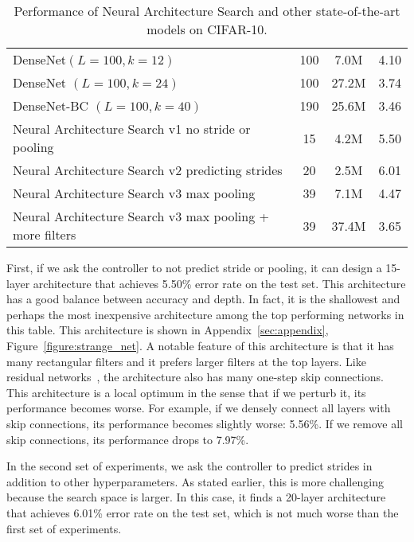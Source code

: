 \documentclass{article} \usepackage{iclr2017_conference,times}
\begin{document}
\begin{table}[h!]
{\begin{tabular}{l|cc|c}
DenseNet$(L=100, k=12)$ \citet{Huang2016Densely} & 100 & 7.0M &  4.10  \\
DenseNet $(L=100, k=24)$ \citet{Huang2016Densely} & 100 & 27.2M &  3.74  \\ 
DenseNet-BC $(L=100, k=40)$ \citet{Huang2016Densely2} & 190 & 25.6M &  3.46  \\ 
\midrule
Neural Architecture Search v1 no stride or pooling & 15 & 4.2M & 5.50   \\
Neural Architecture Search v2 predicting strides & 20 & 2.5M & 6.01  \\
Neural Architecture Search v3 max pooling & 39 & 7.1M & 4.47  \\
Neural Architecture Search v3 max pooling + more filters & 39 & 37.4M & 3.65 \\
\bottomrule
\end{tabular}}
\caption{Performance of Neural Architecture Search and other state-of-the-art models on CIFAR-10.}
\label{tab:cifar10}
\end{table}
 







 

First, if we ask the controller to not predict stride or pooling, it can design a 15-layer architecture that achieves 5.50\% error rate on the test set. This architecture has a good balance between accuracy and depth. In fact, it is the shallowest and perhaps the most inexpensive architecture among the top performing networks in this table. This architecture is shown in Appendix~\ref{sec:appendix}, Figure~\ref{figure:strange_net}. A notable feature of this architecture is that it has many rectangular filters and it prefers larger filters at the top layers. Like residual networks~\citep{he2015deep}, the architecture also has many one-step skip connections. This architecture is a local optimum in the sense that if we perturb it, its performance becomes worse. For example, if we densely connect all layers with skip connections, its performance becomes slightly worse: 5.56\%. If we remove all skip connections, its performance drops to 7.97\%. 


In the second set of experiments, we ask the controller to predict strides in addition to other hyperparameters. As stated earlier, this is more challenging because the search space is larger. In this case, it finds a 20-layer architecture that achieves 6.01\% error rate on the test set, which is not much worse than the first set of experiments. 
\end{document}
